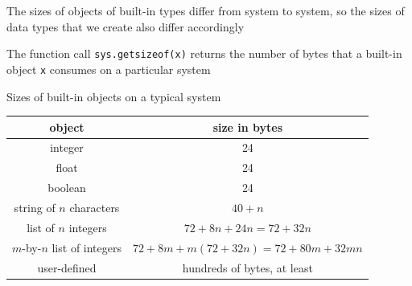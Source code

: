 \documentclass[8pt,a4paper,compress,handout]{beamer}
\begin{document}
\begin{frame}[fragile]
The sizes of objects of built-in types differ from system to system, so the sizes of data types that we create also differ accordingly

\bigskip

The function call \lstinline{sys.getsizeof(x)} returns the number of bytes that a built-in object \lstinline{x} consumes on a particular system

\bigskip

Sizes of built-in objects on a typical system
\begin{center}
\begin{tabular}{cc}
object & size in bytes \\ \hline
integer & 24 \\ 
float & 24 \\ 
boolean & 24 \\ 
string of $n$ characters & $40 + n$ \\
list of $n$ integers & $72 + 8n + 24n = 72 + 32n$ \\
$m$-by-$n$ list of integers & $72 + 8m + m(72 + 32n) = 72 + 80m + 32mn$ \\
user-defined & hundreds of bytes, at least
\end{tabular} 
\end{center}
\end{frame}
\end{document}
